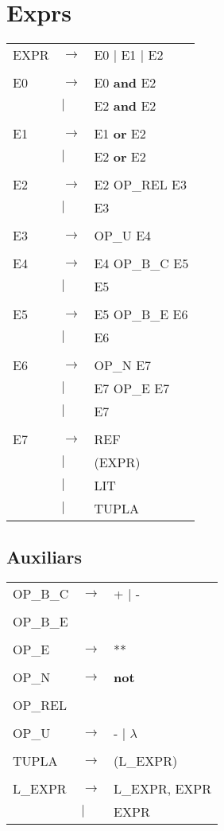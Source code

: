 \documentclass{article}
\begin{document}
	\section{Exprs}
	\begin{tabular}{l l l}
		EXPR&$\to$&E0 $|$ E1 $|$ E2\\
		\\
		E0&$\to$&E0 \textbf{and} E2\\
		&$|$&E2 \textbf{and} E2\\
		\\
		E1&$\to$&E1 \textbf{or} E2\\
		&$|$&E2 \textbf{or} E2\\
		\\
		E2&$\to$&E2 OP\_REL E3\\
		&$|$&E3\\
		\\
		E3&$\to$&OP\_U E4\\
		\\
		E4&$\to$&E4 OP\_B\_C E5\\
		&$|$&E5\\
		\\
		E5&$\to$&E5 OP\_B\_E E6\\
		&$|$&E6\\
		\\
		E6&$\to$&OP\_N E7\\
		&$|$&E7 OP\_E E7\\
		&$|$&E7\\
		\\
		E7&$\to$&REF\\
		&$|$&(EXPR)\\
		&$|$&LIT\\
		&$|$&TUPLA
	\end{tabular}
	\subsection{Auxiliars}
	\begin{tabular}{l l l}
		OP\_B\_C&$\to$&+ $|$ -\\
		\\
		OP\_B\_E\\
		\\
		OP\_E&$\to$&**\\
		\\
		OP\_N&$\to$&\textbf{not}\\
		\\
		OP\_REL\\
		\\
		OP\_U&$\to$&- $|$ $\lambda$\\
		\\
		TUPLA&$\to$&(L\_EXPR)\\
		\\
		L\_EXPR&$\to$&L\_EXPR, EXPR\\
		&$|$&EXPR
	\end{tabular}
\end{document}

